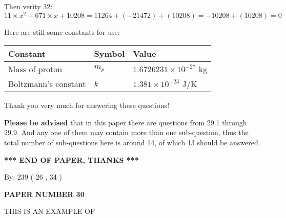 \documentclass[12pt]{article}
\begin{document}
Then verity  %
32:
$  %
11 \times x^2  %
-671
                 \times x    %
+  %
10208
  = %
11264+( %
-21472)+( %
10208)
  = %
-10208+( %
10208)
  = %
0
$
 
 
 
   
   
 \vspace{0.2in}
Here are still some constants for use:
 
 
\noindent\begin{tabular}{|l|l|l|}
\hline
Constant & Symbol & Value \\
\hline
 
Mass of proton &
$m_p$ &
 $ 1.6726231 \times 10^{-27} $
kg \\
\hline
 
Boltzmann's constant &
$k$ &
 $ 1.381 \times 10^{-23} $
J/K \\
\hline
 
\end{tabular}
 
Thank you very much for answering these questions!
 
{\textbf{\large{Please be advised}}} that in this paper there are questions from
29.1 through
29.9.
And any one of them may contain more than one sub-question, thus the total number
of sub-questions here is around 14, of which
13 should be answered.
 
   
   
   
   
\vspace{1.0in} 
{\textbf{\large{ *** END OF PAPER, THANKS *** }}} 
   
   
\hspace{1.0in} By: 
         239 (          26 ,           34 )
   
   
   
   
\newpage 
\setcounter{page}{ 
    30001 } 
   
   
   
   
 {\textbf{ \Large{ PAPER NUMBER           30  }}}
   
   
\vspace{0.2in}
   
   
   
   
   
   
 \vspace{0.2in}
 
 
{\Huge  THIS IS AN EXAMPLE OF}
 
\end{document}
